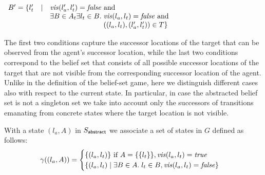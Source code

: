 \begin{itemize}
\begin{itemize}
$\begin{array}{lll}
B' = \{l_t' & \mid & \mathit{vis}(l_a',l_t') = \mathit{false} \text{ and }\\
&&\exists B \in A_t \exists l_t \in B.\; \mathit{vis}(l_a,l_t) = \mathit{false} \text{ and }\\
&&\phantom{\exists B \in A_t \exists l_t \in B.\;} ((l_a,l_t),(l_a',l_t')) \in T
\}
\end{array}
$
\end{itemize}
The first two conditions capture the successor locations of the target that can be observed from the agent's successor location, while the last two conditions  correspond to the belief set that consists of all possible successor locations of the target that are not visible from the corresponding successor location of the agent. Unlike in the definition of the belief-set game, here we distinguish different cases also with respect to the current state. In particular, in case the abstracted belief set is not a singleton set we take into account only the successors of transitions emanating from concrete states where the target location is not visible.

\end{itemize}



With a state $(l_a,A)$ in $S_{\mathsf{abstract}}$ we associate a set of states in $G$ defined as follows:
\[
\gamma((l_a,A)) =
\begin{cases}
\{(l_a,l_t)\} \text{ if } A = \{\{l_t\}\}, \mathit{vis}(l_a,l_t) = \mathit{true}\\
\{(l_a,l_t) \mid \exists B\in A.\; l_t \in B, \mathit{vis}(l_a,l_t) = \mathit{false}\}\\
\end{cases}
\]
